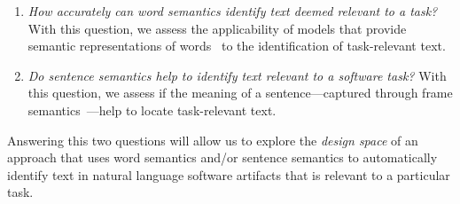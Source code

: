 \begin{enumerate}[label=\textit{RQ\arabic*}]

    \item \textit{How accurately can word semantics identify text deemed relevant to a task?}
    With this question, we assess the applicability of models that provide semantic representations of words~\cite{Mikolov2013, Devlin2018Bert}  to the identification of  task-relevant text.
    
    
    \item \textit{Do sentence semantics help to identify text relevant to a software task?}
    With this question, we assess if the meaning of a sentence---captured through frame semantics~\cite{fillmore1976frame}---help to locate task-relevant text.
\end{enumerate}


Answering this two questions will allow us to explore the \textit{design space} of an approach that uses word semantics and/or sentence semantics  to automatically identify text in natural language software artifacts that is relevant to a particular task.